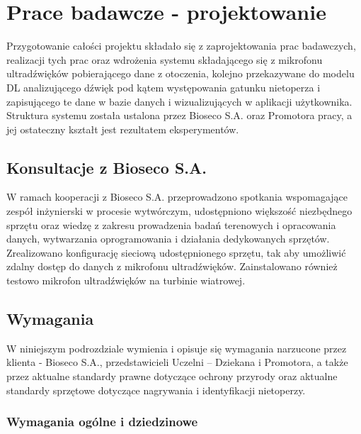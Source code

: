 \documentclass{sprz}
\begin{document}
\chapter{Prace badawcze - projektowanie}

Przygotowanie całości projektu składało się z zaprojektowania prac badawczych, realizacji tych prac oraz wdrożenia systemu składającego się z mikrofonu ultradźwięków pobierającego dane z otoczenia, kolejno przekazywane do modelu DL analizującego dźwięk pod kątem występowania gatunku nietoperza i zapisującego te dane w bazie danych i wizualizujących w aplikacji użytkownika. Struktura systemu została ustalona przez Bioseco S.A. oraz Promotora pracy, a jej ostateczny kształt jest rezultatem eksperymentów. 

\section{Konsultacje z Bioseco S.A.}
W ramach kooperacji z Bioseco S.A. przeprowadzono spotkania wspomagające zespół inżynierski w procesie wytwórczym, udostępniono większość niezbędnego sprzętu oraz wiedzę z zakresu prowadzenia badań terenowych i opracowania danych, wytwarzania oprogramowania i działania dedykowanych sprzętów. Zrealizowano konfigurację sieciową udostępnionego sprzętu, tak aby umożliwić zdalny dostęp do danych z mikrofonu ultradźwięków. Zainstalowano również testowo mikrofon ultradźwięków na turbinie wiatrowej.

\section{Wymagania}
  
W niniejszym podrozdziale wymienia i opisuje się wymagania narzucone przez klienta - Bioseco S.A., przedstawicieli Uczelni – Dziekana i Promotora, a także przez aktualne standardy prawne dotyczące ochrony przyrody oraz aktualne standardy sprzętowe dotyczące nagrywania i identyfikacji nietoperzy.

\subsection*{Wymagania ogólne i dziedzinowe}

  \begin{requirementstab}[label={tab:requirements:general},caption={Baza danych nagrań głosów nietoperzy}]
  \end{requirementstab}
\end{document}
